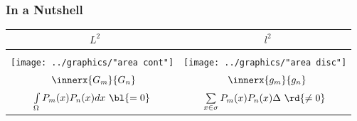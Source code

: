 \documentclass[handout]{beamer}
\begin{document}
\begin{frame}      %
\frametitle{In a Nutshell}
\begin{table}[htdp]
  \begin{center}
    \begin{tabular}{cc}
      \ $L^{2}$ & \qquad \ $l^{2}$ \\\hline
      &\\
      \texttt{[image: ../graphics/"area cont"]} & \qquad
      \texttt{[image: ../graphics/"area disc"]} \\
      $ \ \innerx{G_{m}}{G_{n}} $ & \qquad \ $ \innerx{g_{m}}{g_{n}} $ \\[8pt]
      $ \int\limits_{\Omega} P_{m}(x) P_{n}(x) dx \ \bl{= 0} $ & \qquad
      $ \sum\limits_{x\in\sigma} P_{m}(x) P_{n}(x) \Delta \ \rd{\ne 0}$
    \end{tabular}
  \end{center}
\end{table}%
\twodots
\end{frame}

\end{document}
